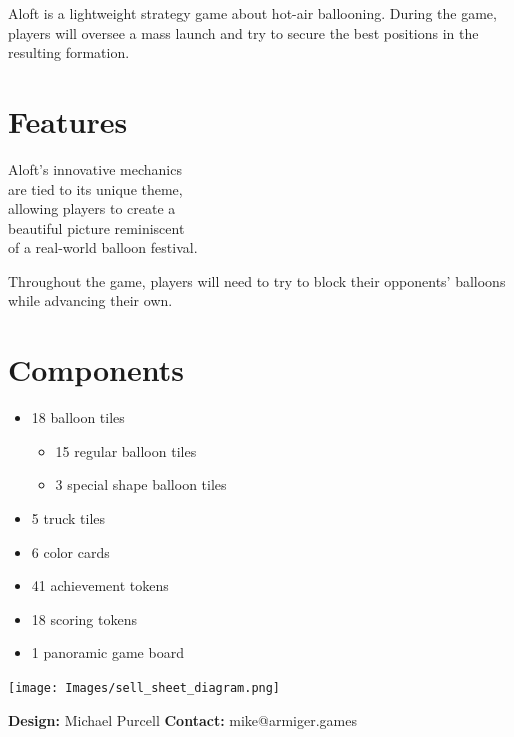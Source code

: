 \documentclass[a5paper, DIV=18, 12pt]{scrartcl}
\begin{document}
\vspace{-0.5ex}
\flushleft
Aloft is a lightweight strategy game about hot-air ballooning. During the game, players will oversee a mass launch and try to secure the best positions in the resulting formation.
\flushleft
\vspace{-0ex}
\begin{multicols}{2}
\section*{\textcolor{SunriseBlue}{Features}}
Aloft's innovative mechanics\\are tied to its unique theme,\\ allowing players to create a\\beautiful picture reminiscent\\of a real-world balloon festival.
\vspace{2.03ex}
 
Throughout the game, players will need to try to block their opponents' balloons while advancing their own.  \vfill\null\columnbreak

\section*{\textcolor{SunriseBlue}{Components}}
\begin{itemize}[nosep, leftmargin=*]
	\item 18 balloon tiles
	\begin{itemize}[nosep, leftmargin=*]
	  \item 15 regular balloon tiles
	  \item 3 special shape balloon tiles
	\end{itemize}
	\vspace{0.92ex}
	\item 5 truck tiles
	\vspace{0.92ex}
	\item 6 color cards
	\vspace{0.92ex}
	\item 41 achievement tokens
	\vspace{0.92ex}
	\item 18 scoring tokens
	\vspace{0.92ex}
	\item 1 panoramic game board
\end{itemize}
\vspace{3.2ex}
\end{multicols}
\begin{center}
\vspace{-1.5ex}
\texttt{[image: Images/sell\_sheet\_diagram.png]}
\end{center}
\textbf{Design:} Michael Purcell \hfill \textbf{Contact:} mike@armiger.games
\end{document}
